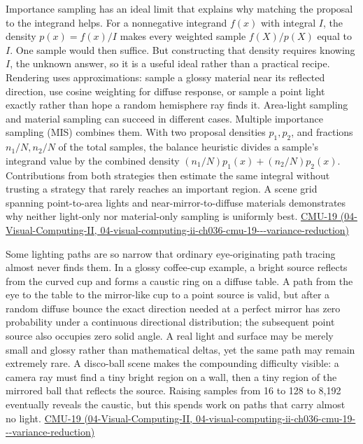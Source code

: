 Importance sampling has an ideal limit that explains why matching the proposal to the integrand helps. For a nonnegative integrand \(f(x)\) with integral \(I\), the density \(p(x)=f(x)/I\) makes every weighted sample \(f(X)/p(X)\) equal to \(I\). One sample would then suffice. But constructing that density requires knowing \(I\), the unknown answer, so it is a useful ideal rather than a practical recipe. Rendering uses approximations: sample a glossy material near its reflected direction, use cosine weighting for diffuse response, or sample a point light exactly rather than hope a random hemisphere ray finds it. Area-light sampling and material sampling can succeed in different cases. Multiple importance sampling (MIS) combines them. With two proposal densities \(p_1,p_2\), and fractions \(n_1/N,n_2/N\) of the total samples, the balance heuristic divides a sample's integrand value by the combined density \((n_1/N)p_1(x)+(n_2/N)p_2(x)\). Contributions from both strategies then estimate the same integral without trusting a strategy that rarely reaches an important region. A scene grid spanning point-to-area lights and near-mirror-to-diffuse materials demonstrates why neither light-only nor material-only sampling is uniformly best. \href{../04-Visual-Computing-II/main.pdf\#nameddest=04-visual-computing-ii-ch036-cmu-19---variance-reduction}{CMU-19 (04-Visual-Computing-II, 04-visual-computing-ii-ch036-cmu-19-\/-\/-variance-reduction)}

Some lighting paths are so narrow that ordinary eye-originating path tracing almost never finds them. In a glossy coffee-cup example, a bright source reflects from the curved cup and forms a caustic ring on a diffuse table. A path from the eye to the table to the mirror-like cup to a point source is valid, but after a random diffuse bounce the exact direction needed at a perfect mirror has zero probability under a continuous directional distribution; the subsequent point source also occupies zero solid angle. A real light and surface may be merely small and glossy rather than mathematical deltas, yet the same path may remain extremely rare. A disco-ball scene makes the compounding difficulty visible: a camera ray must find a tiny bright region on a wall, then a tiny region of the mirrored ball that reflects the source. Raising samples from 16 to 128 to 8,192 eventually reveals the caustic, but this spends work on paths that carry almost no light. \href{../04-Visual-Computing-II/main.pdf\#nameddest=04-visual-computing-ii-ch036-cmu-19---variance-reduction}{CMU-19 (04-Visual-Computing-II, 04-visual-computing-ii-ch036-cmu-19-\/-\/-variance-reduction)}

